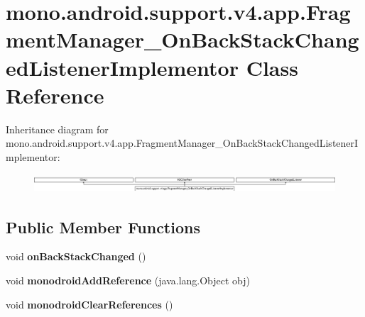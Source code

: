 \hypertarget{classmono_1_1android_1_1support_1_1v4_1_1app_1_1_fragment_manager___on_back_stack_changed_listener_implementor}{}\section{mono.\+android.\+support.\+v4.\+app.\+Fragment\+Manager\+\_\+\+On\+Back\+Stack\+Changed\+Listener\+Implementor Class Reference}
\label{classmono_1_1android_1_1support_1_1v4_1_1app_1_1_fragment_manager___on_back_stack_changed_listener_implementor}
Inheritance diagram for mono.\+android.\+support.\+v4.\+app.\+Fragment\+Manager\+\_\+\+On\+Back\+Stack\+Changed\+Listener\+Implementor\+:\begin{figure}[H]
\begin{center}
\leavevmode
\includegraphics[height=0.691358cm]{classmono_1_1android_1_1support_1_1v4_1_1app_1_1_fragment_manager___on_back_stack_changed_listener_implementor}
\end{center}
\end{figure}
\subsection*{Public Member Functions}
\begin{DoxyCompactItemize}
\item 
\mbox{\label{classmono_1_1android_1_1support_1_1v4_1_1app_1_1_fragment_manager___on_back_stack_changed_listener_implementor_aac1b73d05317d86e387f0387b87775df}} 
void {\bfseries on\+Back\+Stack\+Changed} ()
\item 
\mbox{\label{classmono_1_1android_1_1support_1_1v4_1_1app_1_1_fragment_manager___on_back_stack_changed_listener_implementor_a685912956810c558e72f6494db349d6e}} 
void {\bfseries monodroid\+Add\+Reference} (java.\+lang.\+Object obj)
\item 
\mbox{\label{classmono_1_1android_1_1support_1_1v4_1_1app_1_1_fragment_manager___on_back_stack_changed_listener_implementor_a4272051b3b8101262d9ec7d0aedcc515}} 
void {\bfseries monodroid\+Clear\+References} ()
\end{DoxyCompactItemize}
